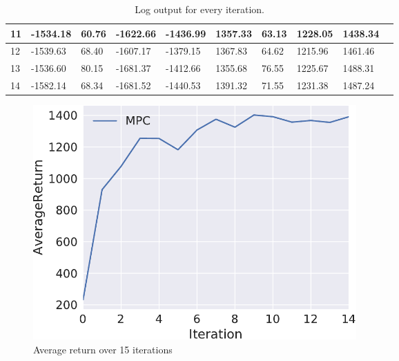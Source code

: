 \documentclass{mwhittaker}
\begin{document}
\begin{table}[ht]
\begin{tabular}{|l|l|l|l|l|l|l|l|l|l|}
    11        & -1534.18 & 60.76   & -1622.66 & -1436.99 & 1357.33   & 63.13     & 1228.05   & 1438.34\\\hline
    12        & -1539.63 & 68.40   & -1607.17 & -1379.15 & 1367.83   & 64.62     & 1215.96   & 1461.46\\\hline
    13        & -1536.60 & 80.15   & -1681.37 & -1412.66 & 1355.68   & 76.55     & 1225.67   & 1488.31\\\hline
    14        & -1582.14 & 68.34   & -1681.52 & -1440.53 & 1391.32   & 71.55     & 1231.38   & 1487.24\\\hline
  \end{tabular}
  \caption{Log output for every iteration.}
  \label{tab:data}
\end{table}

\begin{figure}[ht]
  \centering
  \includegraphics[width=0.6\textwidth]{returns.pdf}
  \caption{Average return over 15 iterations}
  \label{fig:data}
\end{figure}
\end{document}
